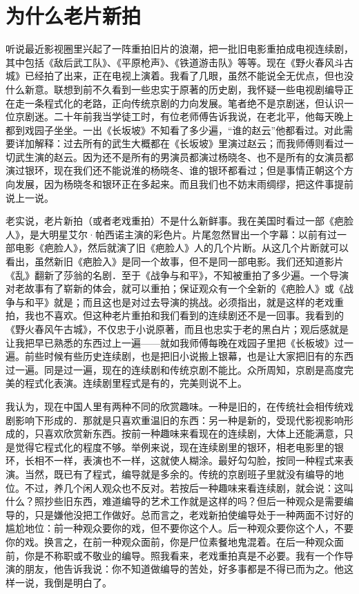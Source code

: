 \chapter{为什么老片新拍}

听说最近影视圈里兴起了一阵重拍旧片的浪潮，把一批旧电影重拍成电视连续剧，其中包括《敌后武工队》、《平原枪声》、《铁道游击队》等等。现在《野火春风斗古城》已经拍了出来，正在电视上演着。我看了几眼，虽然不能说全无优点，但也没什么新意。联想到前不久看到一些忠实于原著的历史剧，我怀疑一些电视剧编导正在走一条程式化的老路，正向传统京剧的力向发展。笔者绝不是京剧迷，但认识一位京剧迷。二十年前我当学徒工时，有位老师傅告诉我说，在老北平，他每天晚上都到戏园子坐坐。一出《长坂坡》不知看了多少遍，“谁的赵云”他都看过。对此需要详加解释：过去所有的武生大概都在《长坂坡》里演过赵云；而我师傅则看过一切武生演的赵云。因为还不是所有的男演员都演过杨晓冬、也不是所有的女演员都演过银环，现在我们还不能说淮的杨晓冬、谁的银环都看过；但是事情正朝这个方向发展，因为杨晓冬和银环正在多起来。而且我们也不妨末雨绸缪，把这件事提前说上一说。 

老实说，老片新拍（或者老戏重拍）不是什么新鲜事。我在美国时看过一部《疤脸人》，是大明星艾尔·帕西诺主演的彩色片。片尾忽然冒出一个字幕：以前有过一部电影《疤脸人》，然后就演了旧《疤脸人》人的几个片断。从这几个片断就可以看出，虽然新旧《疤脸入》是同一个故事，但不是同一部电影。我们还知道影片《乱》翻新了莎翁的名剧．至于《战争与和平》，不知被重拍了多少遍。一个导演对老故事有了崭新的体会，就可以重拍；保证观众有一个全新的《疤脸人》或《战争与和平》就是；而且这也是对过去导演的挑战。必须指出，就是这样的老戏重拍，我也不喜欢。但这种老片重拍和我们看到的连续剧还不是一回事。我看到的《野火春风午古城》，不仅忠于小说原著，而且也忠实于老的黑白片；观后感就是让我把早已熟悉的东西过上一遍——就如我师傅每晚在戏园子里把《长板坡》过一遍。前些时候有些历史连续剧，也是把旧小说搬上银幕，也是让大家把旧有的东西过一遍。同是过一遍，现在的连续剧和传统京剧不能比。众所周知，京剧是高度完美的程式化表演。连续剧里程式是有的，完美则说不上。 

我认为，现在中国人里有两种不同的欣赏趣味。一种是旧的，在传统社会相传统戏剧影响下形成的．那就是只喜欢重温旧的东西：另一种是新的，受现代影视影响形成的，只喜欢欣赏新东西。按前一种趣味来看现在的连续剧，大体上还能满意，只是觉得它程式化的程度不够。举例来说，现在连续剧里的银环，相老电影里的银环，长相不一样，表演也不一样，这就使人糊涂。最好勾勾脸，按同一种程式来表演。当然，既已有了程式，编导就是多余的。传统的京剧班子里就没有编导的地位。不过，养几个闲人观众也不反对。若按后一种趣味来看连续剧，就会说：这叫什么？照抄些旧东西，难道编导的艺术工作就是这样的吗？但后一种观众是需要编导的，只是嫌他没把工作做好。总而言之，老戏新拍使编导处于一种两面不讨好的尴尬地位：前一种观众要你的戏，但不要你这个人。后一种观众要你这个人，不要你的戏。换言之，在前一种观众面前，你是尸位素餐地鬼混着。在后一种观众面前，你是不称职或不敬业的编导。照我看来，老戏重拍真是不必要。我有一个作导演的朋友，他告诉我说：你不知道做编导的苦处，好多事都是不得已而为之。他这样一说，我倒是明白了。
 
